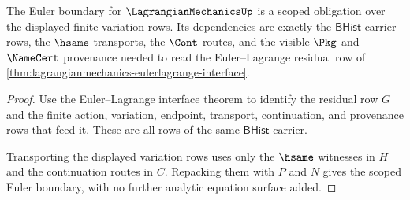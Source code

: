 \begin{theorem}
\label{thm:lagrangianmechanics-euler-boundary-scope}
The Euler boundary for $\LagrangianMechanicsUp$ is a scoped obligation over
the displayed finite variation rows. Its dependencies are exactly the
$\mathsf{BHist}$ carrier rows, the $\hsame$ transports, the $\Cont$ routes,
and the visible $\Pkg$ and $\NameCert$ provenance needed to read the
Euler--Lagrange residual row of
\autoref{thm:lagrangianmechanics-eulerlagrange-interface}.
\end{theorem}
\begin{proof}
Use the Euler--Lagrange interface theorem to identify the residual row $G$ and
the finite action, variation, endpoint, transport, continuation, and
provenance rows that feed it. These are all rows of the same
$\mathsf{BHist}$ carrier.

Transporting the displayed variation rows uses only the $\hsame$ witnesses in
$H$ and the continuation routes in $C$. Repacking them with $P$ and $N$ gives
the scoped Euler boundary, with no further analytic equation surface added.
\end{proof}

